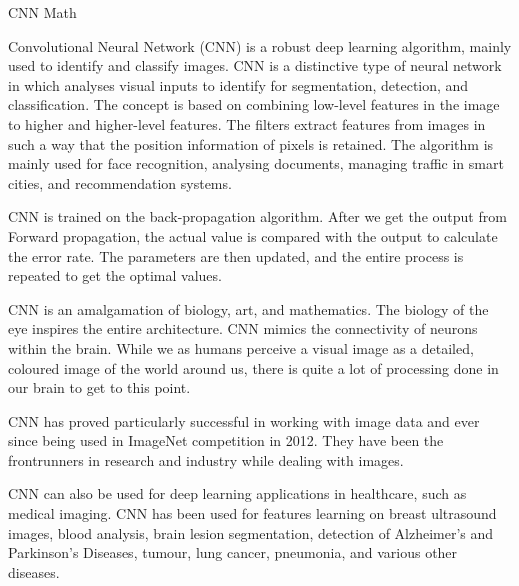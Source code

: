 
CNN Math 

Convolutional Neural Network (CNN) is a robust deep learning algorithm, mainly used to identify and classify images. CNN is a distinctive type of neural network in which analyses visual inputs to identify for segmentation, detection, and classification. The concept is based on combining low-level features in the image to higher and higher-level features. The filters extract features from images in such a way that the position information of pixels is retained. The algorithm is mainly used for face recognition, analysing documents, managing traffic in smart cities, and recommendation systems.
 
CNN is trained on the back-propagation algorithm. After we get the output from Forward propagation, the actual value is compared with the output to calculate the error rate. The parameters are then updated, and the entire process is repeated to get the optimal values.
 
CNN is an amalgamation of biology, art, and mathematics. The biology of the eye inspires the entire architecture. CNN mimics the connectivity of neurons within the brain. While we as humans perceive a visual image as a detailed, coloured image of the world around us, there is quite a lot of processing done in our brain to get to this point.  

CNN has proved particularly successful in working with image data and ever since being used in ImageNet competition in 2012. They have been the frontrunners in research and industry while dealing with images. 

 
CNN can also be used for deep learning applications in healthcare, such as medical imaging. CNN has been used for features learning on breast ultrasound images, blood analysis, brain lesion segmentation, detection of Alzheimer’s and Parkinson’s Diseases, tumour, lung cancer, pneumonia, and various other diseases. 
 


